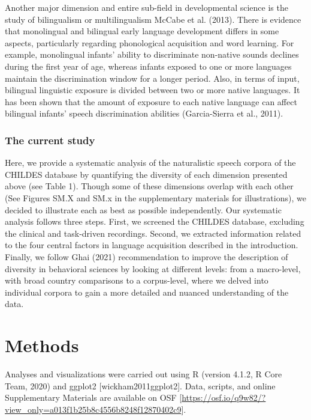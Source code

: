 \documentclass[
  man,floatsintext]{apa6}
\begin{document}
Another major dimension and entire sub-field in developmental science is the study of bilingualism or multilingualism McCabe et al. (2013). There is evidence that monolingual and bilingual early language development differs in some aspects, particularly regarding phonological acquisition and word learning. For example, monolingual infants' ability to discriminate non-native sounds declines during the first year of age, whereas infants exposed to one or more languages maintain the discrimination window for a longer period. Also, in terms of input, bilingual linguistic exposure is divided between two or more native languages. It has been shown that the amount of exposure to each native language can affect bilingual infants' speech discrimination abilities (Garcia-Sierra et al., 2011).

\hypertarget{the-current-study}{%
\subsubsection{The current study}\label{the-current-study}}

Here, we provide a systematic analysis of the naturalistic speech corpora of the CHILDES database by quantifying the diversity of each dimension presented above (see Table 1). Though some of these dimensions overlap with each other (See Figures SM.X and SM.x in the supplementary materials for illustrations), we decided to illustrate each as best as possible independently.
Our systematic analysis follows three steps. First, we screened the CHILDES database, excluding the clinical and task-driven recordings. Second, we extracted information related to the four central factors in language acquisition described in the introduction. Finally, we follow Ghai (2021) recommendation to improve the description of diversity in behavioral sciences by looking at different levels: from a macro-level, with broad country comparisons to a corpus-level, where we delved into individual corpora to gain a more detailed and nuanced understanding of the data.

\hypertarget{methods}{%
\section{Methods}\label{methods}}

Analyses and visualizations were carried out using R (version 4.1.2, R Core Team, 2020) and ggplot2 {[}wickham2011ggplot2{]}. Data, scripts, and online Supplementary Materials are available on OSF {[}\url{https://osf.io/q9w82/?view_only=a013f1b25b8c4556b8248f12870402c9}{]}.
\end{document}
